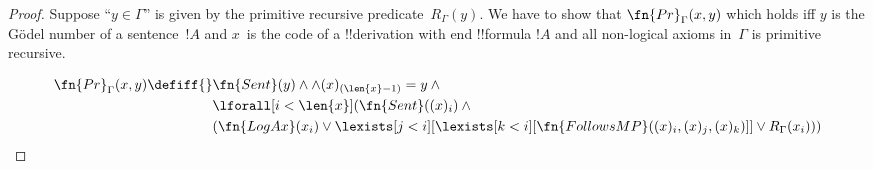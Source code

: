 \documentclass[../../../include/open-logic-section]{subfiles}
\begin{document}
\begin{proof}
Suppose ``$y \in \Gamma$'' is given by the primitive recursive
predicate~$R_\Gamma(y)$.  We have to show that $\fn{Pr}_\Gamma(x, y)$
which holds iff $y$ is the G\"odel number of a sentence~$!A$ and
$x$~is the code of a !!{derivation} with end
!!{formula} $!A$ and all non-logical axioms in~$\Gamma$ is
primitive recursive.

\begin{align*}
\fn{Pr}_\Gamma(x, y) \defiff {}&
\fn{Sent}(y) \land \land (x)_{(\len{x}-1)} = y \land {} \\
& \lforall[i < \len{x}](\fn{Sent}((x)_i) \land {}\\
& (\fn{LogAx}(x_i) \lor
\lexists[j<i][\lexists[k<i][\fn{FollowsMP}((x)_i, (x)_j, (x)_k)]] \lor
R_\Gamma(x_i)))
\end{align*}
\end{proof}
\end{document}
